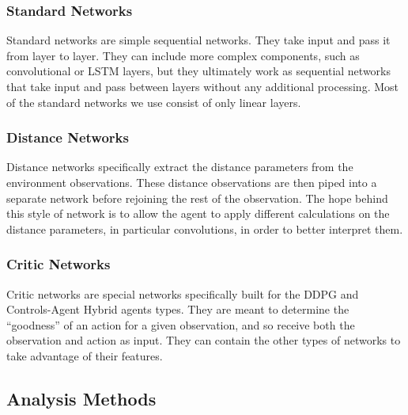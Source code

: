 \subsubsection{Standard Networks}
Standard networks are simple sequential networks.
They take input and pass it from layer to layer.
They can include more complex components, such as convolutional or LSTM layers, but
they ultimately work as sequential networks that take input and pass between layers
without any additional processing.
Most of the standard networks we use consist of only linear layers.

\subsubsection{Distance Networks}
Distance networks specifically extract the distance parameters from the environment
observations.
These distance observations are then piped into a separate network before rejoining the
rest of the observation.
The hope behind this style of network is to allow the agent to apply different
calculations on the distance parameters, in particular convolutions, in order to better
interpret them.

\subsubsection{Critic Networks}
Critic networks are special networks specifically built for the DDPG and
Controls-Agent Hybrid agents types.
They are meant to determine the ``goodness'' of an action for a given observation,
and so receive both the observation and action as input.
They can contain the other types of networks to take advantage of their features.

\subsection{Analysis Methods}\label{subsec:analysis-methods}
